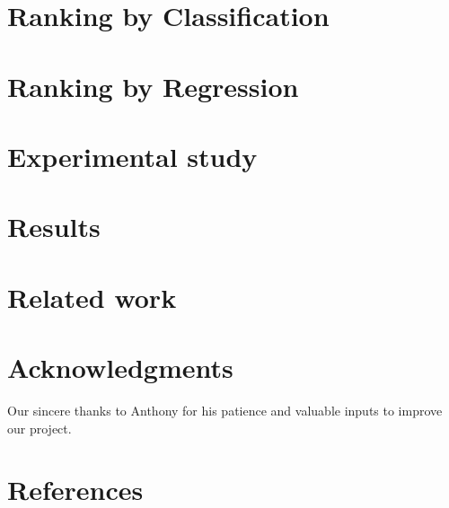 \documentclass{article} %
\begin{document}
\section{Ranking by Classification}
\label{sec:ranking}
	
\section{Ranking by Regression}
\label{sec:regression}
	
\section{Experimental study}
\label{sec:experiment}
	
\section{Results}
\label{sec:results}
	
\section{Related work}
\label{sec:related}
	

\section*{Acknowledgments}
	Our sincere thanks to Anthony for his patience and valuable inputs to improve our project.

\section*{References}
\label{sec:references}
	
\end{document}
